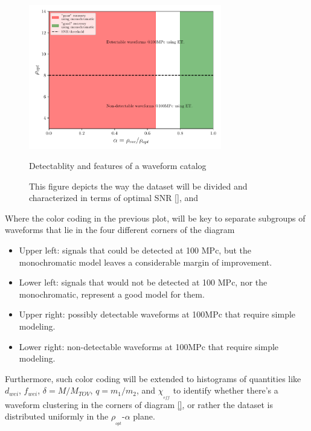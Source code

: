 \begin{figure}[hbt!]
\begin{center}
\includegraphics[width=0.75\textwidth, angle=0]{images/Data_analysis/results/schematics.pdf}
\captionsetup{width=0.8\textwidth}
\caption{Detectablity and features of a waveform catalog}
\caption*{This figure depicts the way the dataset will be divided and characterized in terms of optimal SNR \ref{}, and }
\label{regions}
\end{center} 
\end{figure}

\FloatBarrier

Where the color coding in the previous plot, will be key to separate subgroups of waveforms that lie in the four different corners of the diagram

\begin{itemize}
\item Upper left: signals that could be detected at 100 MPc, but the monochromatic model leaves a considerable margin of improvement.
\item Lower left: signals that would not be detected at 100 MPc, nor the monochromatic, represent a good model for them.
\item 
Upper right: possibly detectable waveforms at 100MPc that require simple modeling.
\item 
Lower right: non-detectable waveforms at 100MPc that require simple modeling.
\end{itemize}

Furthermore, such color coding will be extended to histograms of quantities like $d_{wei}$, $f_{wei}$, $\delta=M/M_{TOV}$, $q=m_1/m_2$, and  $\chi_{_{eff}}$ to identify whether there's a waveform clustering in the corners of diagram \ref{}, or rather the dataset is distributed uniformly in the $\rho_{_{opt}}$-$\alpha$ plane.


